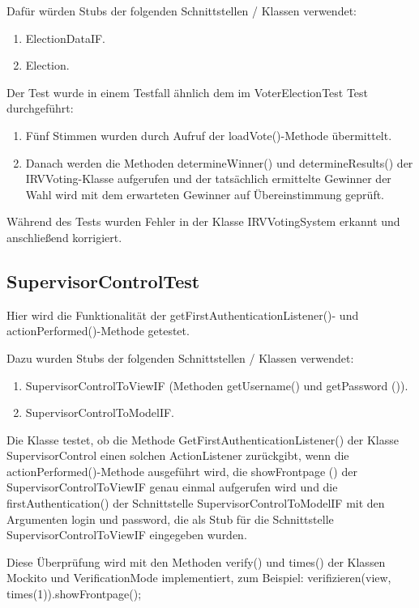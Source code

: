 \documentclass[parskip=full]{scrartcl}
\begin{document}
Dafür würden Stubs der folgenden Schnittstellen / Klassen verwendet: 
\begin{enumerate}
	\item ElectionDataIF. 
	\item Election. 
\end{enumerate}

Der Test wurde in einem Testfall ähnlich dem im VoterElectionTest Test durchgeführt: 

\begin{enumerate}
	\item Fünf Stimmen wurden durch Aufruf der loadVote()-Methode übermittelt.
	\item Danach werden die Methoden determineWinner() und determineResults() der IRVVoting-Klasse aufgerufen und der tatsächlich ermittelte Gewinner der Wahl wird mit dem erwarteten Gewinner auf Übereinstimmung geprüft. 
\end{enumerate}

Während des Tests wurden Fehler in der Klasse IRVVotingSystem erkannt und anschließend korrigiert.

\subsection{SupervisorControlTest} 
Hier wird die Funktionalität der getFirstAuthenticationListener()- und actionPerformed()-Methode getestet.

Dazu wurden Stubs der folgenden Schnittstellen / Klassen verwendet: 
\begin{enumerate}
	\item SupervisorControlToViewIF (Methoden getUsername() und getPassword ()). 
	\item SupervisorControlToModelIF. 
\end{enumerate}

Die Klasse testet, ob die Methode GetFirstAuthenticationListener() der Klasse SupervisorControl einen solchen ActionListener zurückgibt, wenn die actionPerformed()-Methode  ausgeführt wird, die showFrontpage () der SupervisorControlToViewIF genau einmal aufgerufen wird und die firstAuthentication() der Schnittstelle SupervisorControlToModelIF mit den Argumenten login und password, die als Stub für die Schnittstelle SupervisorControlToViewIF eingegeben wurden. 

Diese Überprüfung wird mit den Methoden verify() und times() der Klassen Mockito und VerificationMode implementiert, zum Beispiel: 
verifizieren(view, times(1)).showFrontpage();
\end{document}
